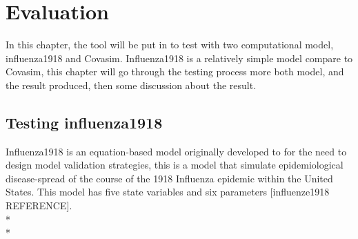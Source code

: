 \chapter{Evaluation}
In this chapter, the tool will be put in to test with two computational model, influenza1918 and Covasim. Influenza1918 is a relatively simple model compare to Covasim, this chapter will go through the testing process more both model, and the result produced, then some discussion about the result.
\section{Testing influenza1918}
Influenza1918 is an equation-based model originally developed to for the need to design model validation strategies, this is a model that simulate epidemiological disease-spread of the course of the 1918 Influenza epidemic within the United States.
This model has five state variables and six parameters [influenze1918 REFERENCE].\\*\\*
